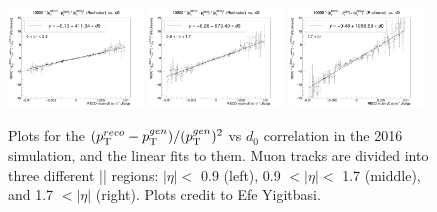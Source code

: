 \begin{figure}[!htb]
      \centering
      \includegraphics[width=0.32\textwidth]{pics/muon_corr/GeoFit/fit_results/2016_DY_eta_0_0p9_dRelPt2p0_Roch.png}
      \includegraphics[width=0.32\textwidth]{pics/muon_corr/GeoFit/fit_results/2016_DY_eta_0p9_1p7_dRelPt2p0_Roch.png}
      \includegraphics[width=0.32\textwidth]{pics/muon_corr/GeoFit/fit_results/2016_DY_eta_1p7_inf_dRelPt2p0_Roch.png}
      \caption{Plots for the $(p_{\mathrm{T}}^{reco}-p_{\mathrm{T}}^{gen})/ (p_{\mathrm{T}}^{gen})^{2}$ vs $d_0$ correlation in the 2016 \DY simulation, 
               and the linear fits to them. Muon tracks are divided into three different |\eta| regions:
               $|\eta| <$ 0.9 (left), 0.9 $< |\eta| <$ 1.7 (middle), and 1.7 $< |\eta|$ (right).
               Plots credit to Efe Yigitbasi.}
      \label{fig:geofit_param_2016}
\end{figure}

